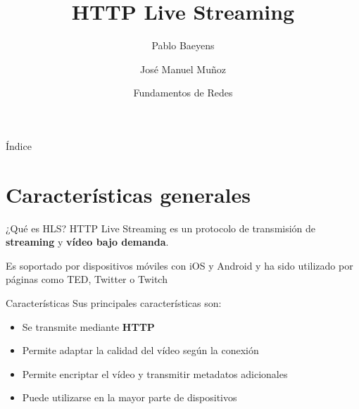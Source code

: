 \documentclass[10pt,compress,usetitleprogressbar,mathserif]{beamer}
\title{HTTP Live Streaming}
\author{Pablo Baeyens \and José Manuel Muñoz}
\date{Fundamentos de Redes}
\begin{document}
\maketitle

\begin{frame}{Índice}
  \tableofcontents
\end{frame}

\section{Características generales}
\begin{frame}{¿Qué es HLS?}
  HTTP Live Streaming es un protocolo de transmisión de \textbf{streaming} y \textbf{vídeo bajo demanda}.

  Es soportado por dispositivos móviles con iOS y Android y ha sido utilizado por páginas como TED, Twitter o Twitch
\end{frame}

\begin{frame}{Características}
  Sus principales características son:
  \begin{itemize}
    \item Se transmite mediante \textbf{HTTP} %
    \item Permite adaptar la calidad del vídeo según la conexión
    \item Permite encriptar el vídeo y transmitir metadatos adicionales
    \item Puede utilizarse en la mayor parte de dispositivos
  \end{itemize}
\end{frame}
\end{document}
